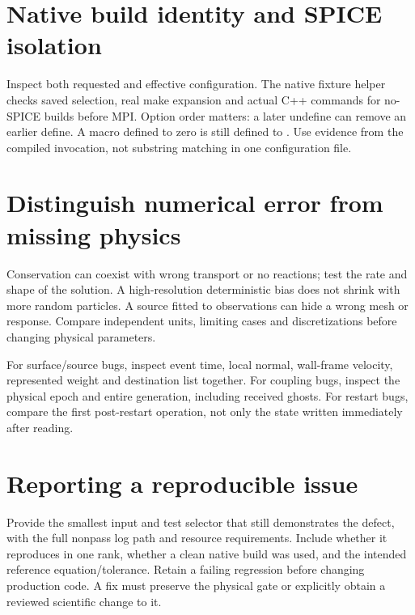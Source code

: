 \section{Native build identity and SPICE isolation}
Inspect both requested and effective configuration. The native fixture helper
checks saved selection, real make expansion and actual C++ commands for
no-SPICE builds before MPI. Option order matters: a later undefine can remove
an earlier define. A macro defined to zero is still defined to .
Use evidence from the compiled invocation, not substring matching in one
configuration file.

\section{Distinguish numerical error from missing physics}
Conservation can coexist with wrong transport or no reactions; test the rate
and shape of the solution. A high-resolution deterministic bias does not
shrink with more random particles. A source fitted to observations can hide
a wrong mesh or response. Compare independent units, limiting cases and
discretizations before changing physical parameters.

For surface/source bugs, inspect event time, local normal, wall-frame
velocity, represented weight and destination list together.
For coupling bugs, inspect the physical epoch and entire generation, including
received ghosts. For restart bugs, compare the first post-restart operation,
not only the state written immediately after reading.

\section{Reporting a reproducible issue}
Provide the smallest input and test selector that still demonstrates the
defect, with the full nonpass log path and resource requirements. Include
whether it reproduces in one rank, whether a clean native build was used,
and the intended reference equation/tolerance. Retain a failing regression
before changing production code. A fix must preserve the physical gate or
explicitly obtain a reviewed scientific change to it.
